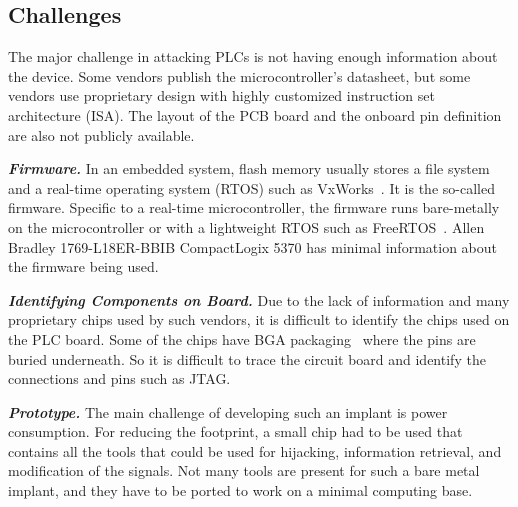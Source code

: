 \subsection{Challenges}

The major challenge in attacking PLCs is not having enough information about the device. Some vendors publish the microcontroller's datasheet, but some vendors use proprietary design with highly customized instruction set architecture (ISA).  The layout of the PCB board and the onboard pin definition are also not publicly available.


\textbf{\textit{Firmware.}} In an embedded system, flash memory usually stores a file system and a real-time operating system (RTOS) such as VxWorks~\cite{neugass1991vxworks}. It is the so-called firmware. Specific to a real-time microcontroller, the firmware runs bare-metally on the microcontroller or with a lightweight RTOS such as FreeRTOS~\cite{barry2008freertos}. Allen Bradley 1769-L18ER-BBIB CompactLogix 5370 has minimal information about the firmware being used. 

\textbf{\textit{Identifying Components on Board.}} Due to the lack of information and many proprietary chips used by such vendors, it is difficult to identify the chips used on the PLC board. Some of the chips have BGA packaging~\cite{joshi2000mosfet} where the pins are buried underneath. So it is difficult to trace the circuit board and identify the connections and pins such as JTAG. 

\textbf{\textit{Prototype.}} The main challenge of developing such an implant is power consumption. For reducing the footprint, a small chip had to be used that contains all the tools that could be used for hijacking, information retrieval, and modification of the signals. Not many tools are present for such a bare metal implant, and they have to be ported to work on a minimal computing base.   

